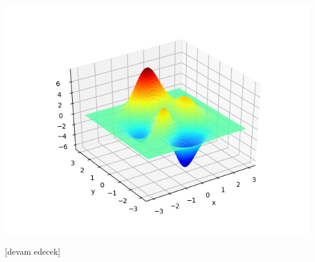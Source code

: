 \documentclass[12pt,fleqn]{article}\usepackage{../../common}
\begin{document}
\includegraphics[width=35 em]{func_70_dfo_02.png}


[devam edecek]
\end{document}
